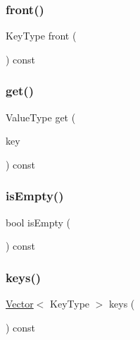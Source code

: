 \mbox{\label{classMap_a6e76878901fa73e176909ac015834f1a}} 
\subsubsection{\texorpdfstring{front()}{front()}}
{\footnotesize\ttfamily Key\+Type front (\begin{DoxyParamCaption}{ }\end{DoxyParamCaption}) const}

\mbox{\label{classMap_a3ac97b0a9a7fa131221427f628667ae9}} 
\subsubsection{\texorpdfstring{get()}{get()}}
{\footnotesize\ttfamily Value\+Type get (\begin{DoxyParamCaption}\item[{const Key\+Type \&}]{key }\end{DoxyParamCaption}) const}

\mbox{\label{classMap_acf82f9b2937375c7b1cf3dccb3df3312}} 
\subsubsection{\texorpdfstring{is\+Empty()}{isEmpty()}}
{\footnotesize\ttfamily bool is\+Empty (\begin{DoxyParamCaption}{ }\end{DoxyParamCaption}) const}

\mbox{\label{classMap_a88e3a058d30d97a5ce6ae57608e7db17}} 
\subsubsection{\texorpdfstring{keys()}{keys()}}
{\footnotesize\ttfamily \mbox{\hyperlink{classVector}{Vector}}$<$ Key\+Type $>$ keys (\begin{DoxyParamCaption}{ }\end{DoxyParamCaption}) const}

\mbox{\label{classMap_a57822037d00ad7cdbf2882e4ab91451d}} 
